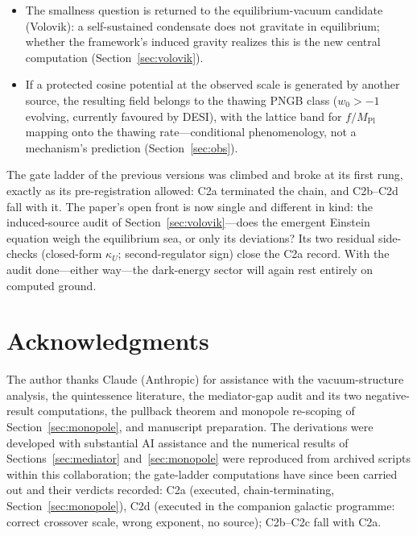 \documentclass[11pt]{article}
\newcommand{\Mpl}{M_{\mathrm{Pl}}}
\begin{document}
\begin{itemize}
  $\kappa_U = -0.00149(1)$, ninety-seven times below the requirement
  and of opposite sign; earlier viability claims are retracted as
  fit-leakage artifacts (Section~\ref{sec:monopole}).  The
  smooth-field Hopf-density theorem survives; the gravitational
  $R\tilde R$ route is the sole registered backup.
\item The smallness question is returned to the equilibrium-vacuum
  candidate (Volovik): a self-sustained condensate does not
  gravitate in equilibrium; whether the framework's induced gravity
  realizes this is the new central computation
  (Section~\ref{sec:volovik}).
\item If a protected cosine potential at the observed scale is
  generated by another source, the resulting field belongs to the
  thawing PNGB class ($w_0>-1$ evolving, currently favoured by
  DESI), with the lattice band for $f/\Mpl$ mapping onto the thawing
  rate---conditional phenomenology, not a mechanism's prediction
  (Section~\ref{sec:obs}).
\end{itemize}

The gate ladder of the previous versions was climbed and broke at
its first rung, exactly as its pre-registration allowed: C2a
terminated the chain, and C2b--C2d fall with it.  The paper's open
front is now single and different in kind: the induced-source audit
of Section~\ref{sec:volovik}---does the emergent Einstein equation
weigh the equilibrium sea, or only its deviations?  Its two residual
side-checks (closed-form $\kappa_U$; second-regulator sign) close
the C2a record.  With the audit done---either way---the dark-energy
sector will again rest entirely on computed ground.

\section*{Acknowledgments}
The author thanks Claude (Anthropic) for assistance with the
vacuum-structure analysis, the quintessence literature, the
mediator-gap audit and its two negative-result computations, the
pullback theorem and monopole re-scoping of
Section~\ref{sec:monopole}, and manuscript preparation.  The
derivations were developed with substantial AI assistance and the
numerical results of Sections~\ref{sec:mediator}
and~\ref{sec:monopole} were reproduced from archived scripts within
this collaboration; the gate-ladder computations have since been carried out and their
verdicts recorded: C2a (executed, chain-terminating,
Section~\ref{sec:monopole}), C2d (executed in the companion galactic
programme: correct crossover scale, wrong exponent, no source);
C2b--C2c fall with C2a.
\end{document}
